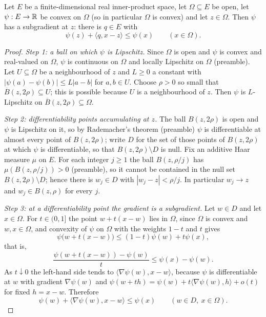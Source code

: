 \begin{lemma}
Let $E$ be a finite-dimensional real inner-product space, let $\Omega\subseteq E$
be open, let $\psi:E\to\mathbb{R}$ be convex on $\Omega$ (so in particular $\Omega$ is
convex) and let $z\in\Omega$. Then $\psi$ has a subgradient at $z$: there is
$q\in E$ with
\[
  \psi(z)+\langle q,x-z\rangle\le\psi(x)\qquad(x\in\Omega).
\]
\end{lemma}
\begin{proof}
\emph{Step 1: a ball on which $\psi$ is Lipschitz.}
Since $\Omega$ is open and $\psi$ is convex and real-valued on $\Omega$, $\psi$
is continuous on $\Omega$ and locally Lipschitz on $\Omega$ (preamble). Let
$U\subseteq\Omega$ be a neighbourhood of $z$ and $L\ge0$ a constant with
$|\psi(a)-\psi(b)|\le L|a-b|$ for $a,b\in U$. Choose $\rho>0$ so small that
$\overline B(z,2\rho)\subseteq U$; this is possible because $U$ is a
neighbourhood of $z$. Then $\psi$ is $L$-Lipschitz on $\overline
B(z,2\rho)\subseteq\Omega$.

\emph{Step 2: differentiability points accumulating at $z$.}
The ball $B(z,2\rho)$ is open and $\psi$ is Lipschitz on it, so by Rademacher's
theorem (preamble) $\psi$ is differentiable at almost every point of
$B(z,2\rho)$; write $D$ for the set of those points of $B(z,2\rho)$ at which
$\psi$ is differentiable, so that $B(z,2\rho)\setminus D$ is null. Fix an
additive Haar measure $\mu$ on $E$. For each integer $j\ge1$ the ball
$B(z,\rho/j)$ has $\mu(B(z,\rho/j))>0$ (preamble), so it cannot be contained in
the null set $B(z,2\rho)\setminus D$; hence there is
$w_j\in D$ with $|w_j-z|<\rho/j$. In particular $w_j\to z$ and
$w_j\in B(z,\rho)$ for every $j$.

\emph{Step 3: at a differentiability point the gradient is a subgradient.}
Let $w\in D$ and let $x\in\Omega$. For $t\in(0,1]$ the point $w+t(x-w)$ lies in
$\Omega$, since $\Omega$ is convex and $w,x\in\Omega$, and convexity of $\psi$ on
$\Omega$ with the weights $1-t$ and $t$ gives
\[
  \psi\bigl(w+t(x-w)\bigr)\le(1-t)\psi(w)+t\psi(x),
\]
that is,
\[
  \frac{\psi(w+t(x-w))-\psi(w)}{t}\le\psi(x)-\psi(w).
\]
As $t\downarrow0$ the left-hand side tends to $\langle\nabla\psi(w),x-w\rangle$,
because $\psi$ is differentiable at $w$ with gradient $\nabla\psi(w)$ and
$\psi(w+th)=\psi(w)+t\langle\nabla\psi(w),h\rangle+o(t)$ for fixed $h=x-w$.
Therefore
\begin{equation}\label{eq:cse-subgrad-at-w}
  \psi(w)+\langle\nabla\psi(w),x-w\rangle\le\psi(x)\qquad(w\in D,\ x\in\Omega).
\end{equation}


\end{proof}
